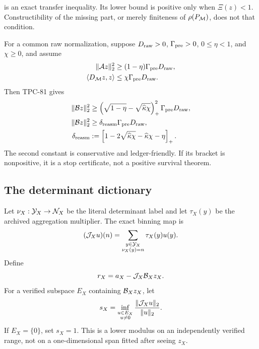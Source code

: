 \begin{remark}
 is an exact transfer inequality.  Its
lower bound is positive only when \(\Xi(z)<1\).  Constructibility of
the missing part, or merely finiteness of \(\rho(P_{\mathcal M})\), does not
that condition.
\end{remark}

For a common raw normalization, suppose
\(D_{\rm raw}>0\), \(\Gamma_{\rm pre}>0\),
\(0\le\eta<1\), and \(\chi\ge0\), and assume
\begin{align}
 \|\mathcal A z\|_2^2
 &\ge(1-\eta)\Gamma_{\rm pre}D_{\rm raw},
 \label{eq:represented-lower-audit}\\
 \langle D_{\mathcal M}z,z\rangle
 &\le\chi\Gamma_{\rm pre}D_{\rm raw}.
 \label{eq:missing-upper-audit}
\end{align}
Then TPC-81 gives
\begin{align}
 \|\mathcal B z\|_2^2
 &\ge
 \left(\sqrt{1-\eta}-\sqrt{\widehat\kappa\chi}\right)_+^2
 \Gamma_{\rm pre}D_{\rm raw},\label{eq:sharp-reasm-audit}\\
 \|\mathcal B z\|_2^2
 &\ge
 \delta_{\rm reasm}\Gamma_{\rm pre}D_{\rm raw},\label{eq:uniform-reasm-audit}\\
 \delta_{\rm reasm}
 &:=
 \left[
 1-2\sqrt{\widehat\kappa\chi}
 -\widehat\kappa\chi-\eta
 \right]_+.
\label{eq:delta-reasm-audit}
\end{align}
The second constant is conservative and ledger-friendly.  If its
bracket is nonpositive, it is a stop certificate, not a positive
survival theorem.

\subsection{The determinant dictionary}

Let \(\nu_X:\mathcal Y_X\to\mathcal N_X\) be the literal determinant label and let
\(\tau_X(y)\) be the archived aggregation multiplier.  The exact
binning map is
\begin{equation}
 (\mathcal J_Xu)(n)=
 \sum_{\substack{y\in\mathcal Y_X\\\nu_X(y)=n}}
 \tau_X(y)u(y).
\label{eq:literal-binning-audit}
\end{equation}
Define
\begin{equation}
 r_X=a_X-\mathcal J_X\mathcal B_Xz_X.
\label{eq:dictionary-residual-audit}
\end{equation}
For a verified subspace \(E_X\) containing
\(\mathcal B_Xz_X\), let
\begin{equation}
 s_X=
 \inf_{\substack{u\in E_X\\u\ne0}}
 \frac{\|\mathcal J_Xu\|_2}{\|u\|_2}.
\label{eq:lower-modulus-audit}
\end{equation}
If \(E_X=\{0\}\), set \(s_X=1\).
This is a lower modulus on an independently verified range, not on a
one-dimensional span fitted after seeing \(z_X\).

